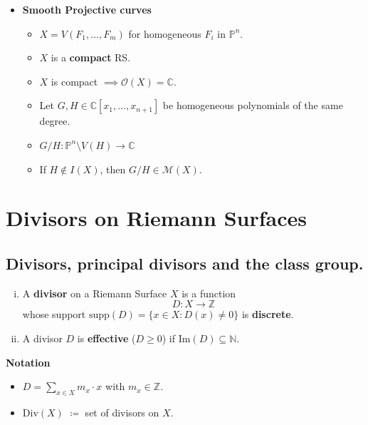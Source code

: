 \documentclass{article}
\begin{document}
\begin{itemize}
    \item \textbf{Smooth Projective curves}
    \begin{itemize}
        \item $X = V(F_1, \dots, F_m)$ for homogeneous $F_i$ in $\mathbb{P}^n$.
        \item $X$ is a \textbf{compact} RS.
        \item $X$ is compact $\implies \mathcal{O}(X) = \mathbb{C}$.
        \item Let $G, H \in \mathbb{C}[x_1, \dots, x_{n+1}]$ be homogeneous polynomials of the same degree.
        \item $G/H: \mathbb{P}^n \setminus V(H) \to \mathbb{C}$
        \item If $H \notin I(X)$, then $G/H \in \mathcal{M}(X)$.
    \end{itemize}
\end{itemize}

\newpage
\section{Divisors on Riemann Surfaces}

\subsection{Divisors, principal divisors and the class group.}

\begin{definition}
    \begin{enumerate}[(i)]
        \item A \textbf{divisor} on a Riemann Surface $X$ is a function
        $$D: X \to \mathbb{Z}$$
        whose support $\text{supp}(D) = \{x \in X: D(x) \neq 0\}$ is \textbf{discrete}.
        \item A divisor $D$ is \textbf{effective} ($D \ge 0$) if $\text{Im}(D) \subseteq \mathbb{N}$.
    \end{enumerate}
\end{definition}

\noindent \textbf{Notation}
    \begin{itemize}
        \item $D = \sum_{x \in X} m_x \cdot x$ with $m_x \in \mathbb{Z}$.
        \item $\text{Div}(X)$ $\coloneqq$ set of divisors on $X$.
    \end{itemize}
\end{document}
